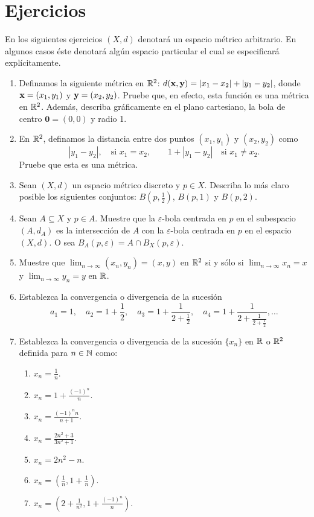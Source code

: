 \section{Ejercicios}

En los siguientes ejercicios $(X, d)$ denotará un espacio métrico arbitrario. En algunos casos éste denotará algún espacio particular el cual se especificará explícitamente.

\begin{enumerate}
    \item Definamos la siguiente métrica en $\mathbb{R}^2$: $d(\mathbf{x},\mathbf{y}) = |x_1 - x_2| + |y_1 - y_2|$, donde $\mathbf{x} = (x_1, y_1)$ y $\mathbf{y} = (x_2, y_2)$. Pruebe que, en efecto, esta función es una métrica en $\mathbb{R}^2$. Además, describa gráficamente en el plano cartesiano, la bola de centro $\mathbf{0} = (0,0)$ y radio 1.
    
    \item En $\mathbb{R}^2$, definamos la distancia entre dos puntos $(x_1, y_1)$ y $(x_2, y_2)$ como
    \[ |y_1 - y_2|, \quad \text{si } x_1 = x_2, \qquad 1 + |y_1 - y_2| \quad \text{si } x_1 \neq x_2. \]
    Pruebe que esta es una métrica.
    
    \item Sean $(X, d)$ un espacio métrico discreto y $p \in X$. Describa lo más claro posible los siguientes conjuntos: $B(p, \frac{1}{2})$, $B(p, 1)$ y $B(p, 2)$.
    
    \item Sean $A \subseteq X$ y $p \in A$. Muestre que la $\varepsilon$-bola centrada en $p$ en el subespacio $(A, d_A)$ es la intersección de $A$ con la $\varepsilon$-bola centrada en $p$ en el espacio $(X, d)$. O sea $B_A(p, \varepsilon) = A \cap B_X(p, \varepsilon)$.
    
    \item Muestre que $\lim_{n \to \infty} (x_n, y_n) = (x, y)$ en $\mathbb{R}^2$ si y sólo si $\lim_{n \to \infty} x_n = x$ y $\lim_{n \to \infty} y_n = y$ en $\mathbb{R}$.
    
    \item Establezca la convergencia o divergencia de la sucesión
    \[ a_1 = 1, \quad a_2 = 1 + \frac{1}{2}, \quad a_3 = 1 + \frac{1}{2 + \frac{1}{2}}, \quad a_4 = 1 + \frac{1}{2 + \frac{1}{2 + \frac{1}{2}}}, \dots \]
    
    \item Establezca la convergencia o divergencia de la sucesión $\{x_n\}$ en $\mathbb{R}$ o $\mathbb{R}^2$ definida para $n \in \mathbb{N}$ como:
    \begin{enumerate}
        \item[a)] $x_n = \frac{1}{n}$.
        \item[b)] $x_n = 1 + \frac{(-1)^n}{n}$.
        \item[c)] $x_n = \frac{(-1)^n n}{n+1}$.
        \item[d)] $x_n = \frac{2n^2 + 3}{3n^2 + 1}$.
        \item[e)] $x_n = 2n^2 - n$.
        \item[f)] $x_n = \left(\frac{1}{n}, 1 + \frac{1}{n}\right)$.
        \item[g)] $x_n = \left(2 + \frac{1}{n^2}, 1 + \frac{(-1)^n}{n}\right)$.
    \end{enumerate}
    

\end{enumerate}
